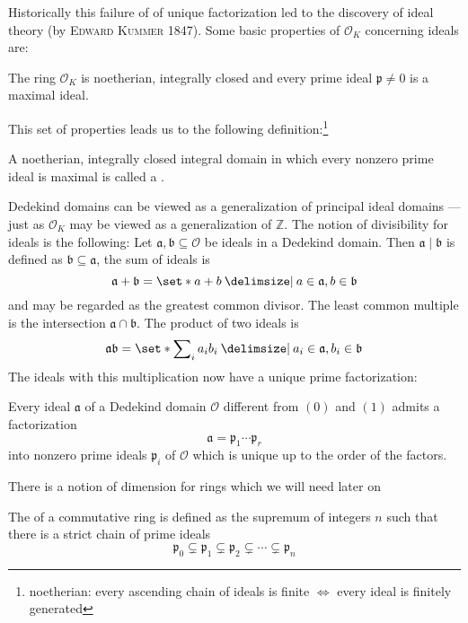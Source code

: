 Historically this failure of of unique factorization led to the discovery of ideal theory (by \textsc{Edward Kummer} 1847).
Some basic properties of $\mathcal{O}_K$ concerning ideals are:

\begin{theorem}[{name={\cite[Thm.~3.1]{neukirch}}}]
	The ring $\mathcal{O}_K$ is noetherian, integrally closed and every prime ideal $\mathfrak{p} \neq 0$ is a maximal ideal.
\end{theorem}

This set of properties leads us to the following definition:\footnote{noetherian: every ascending chain of ideals is finite $\iff$ every ideal is finitely generated}

\begin{definition}[{name=[Dedekind domain]}]
	A noetherian, integrally closed integral domain in which every nonzero prime ideal is maximal is called a .
\end{definition}

Dedekind domains can be viewed as a generalization of principal ideal domains --- just as $\mathcal{O}_K$ may be viewed as a generalization of $\mathbb{Z}$.
The notion of divisibility for ideals is the following: Let $\mathfrak{a}, \mathfrak{b} \subseteq \mathcal{O}$ be ideals in a Dedekind domain.
Then $\mathfrak{a} \mid \mathfrak{b}$ is defined as $\mathfrak{b} \subseteq \mathfrak{a}$, the sum of ideals is
\[
	\mathfrak{a} + \mathfrak{b} = \set*{a + b \given a \in \mathfrak{a}, b \in \mathfrak{b}}
\]
and may be regarded as the greatest common divisor.
The least common multiple is the intersection $\mathfrak{a} \cap \mathfrak{b}$.
The product of two ideals is
\[
	\mathfrak{a} \mathfrak{b} = \set*{\sum\nolimits_i a_i b_i \given a_i \in \mathfrak{a}, b_i \in \mathfrak{b}}
\]
The ideals with this multiplication now have a unique prime factorization:

\begin{theorem}[{name={\cite[Thm.~3.3]{neukirch}}}]
	Every ideal $\mathfrak{a}$ of a Dedekind domain $\mathcal{O}$ different from $(0)$ and $(1)$ admits a factorization
	\[
		\mathfrak{a} = \mathfrak{p}_1 \cdots \mathfrak{p}_r
	\]
	into nonzero prime ideals $\mathfrak{p}_i$ of $\mathcal{O}$ which is unique up to the order of the factors.
\end{theorem}

There is a notion of dimension for rings which we will need later on
\begin{definition}[{name=[Krull dimension]}]
	The  of a commutative ring is defined as the supremum of integers $n$ such that there is a strict chain of prime ideals
	\[
		\mathfrak{p}_0 \subsetneq \mathfrak{p}_1 \subsetneq \mathfrak{p}_2 \subsetneq \cdots \subsetneq \mathfrak{p}_n
	\]
\end{definition}

